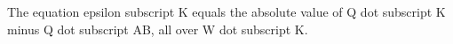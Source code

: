 The equation epsilon subscript K equals the absolute value of Q dot subscript K minus Q dot subscript AB, all over W dot subscript K.